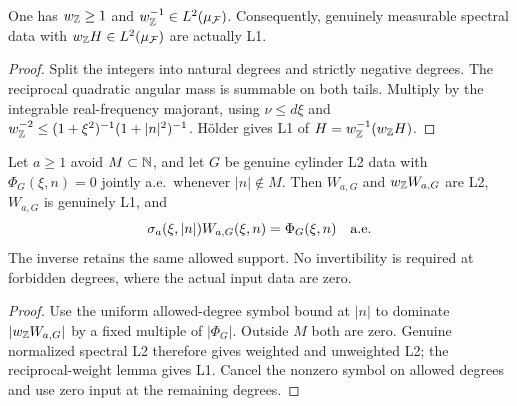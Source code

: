 \begin{lemma}
\label{lem:cylinder-signed-mass}
\leanok
One has $w_{\mathbb{Z}}\ge1$ and $w_{\mathbb{Z}}^{-1}\in L^2(\mu_{\mathcal F})$.
Consequently, genuinely measurable spectral data with
$w_{\mathbb{Z}}H\in L^2(\mu_{\mathcal F})$ are actually L1.
\end{lemma}

\begin{proof}
\leanok
Split the integers into natural degrees and strictly negative degrees. The
reciprocal quadratic angular mass is summable on both tails. Multiply by the
integrable real-frequency majorant, using $\nu\le d\xi$ and
$w_{\mathbb{Z}}^{-2}\le(1+\xi^2)^{-1}(1+|n|^2)^{-1}$. Hölder gives L1 of
$H=w_{\mathbb{Z}}^{-1}(w_{\mathbb{Z}}H)$.
\end{proof}

\begin{lemma}
\label{lem:cylinder-signed-inverse}
\leanok
Let $a\ge1$ avoid $M\subset\mathbb{N}$, and let $G$ be genuine cylinder L2 data with
$\Phi_G(\xi,n)=0$ jointly a.e.\ whenever $|n|\notin M$.
Then $W_{a,G}$ and $w_{\mathbb{Z}}W_{a,G}$ are L2, $W_{a,G}$ is genuinely L1, and
\[
 \sigma_a(\xi,|n|)W_{a,G}(\xi,n)=\Phi_G(\xi,n)\quad\hbox{a.e.}
\]
The inverse retains the same allowed support. No invertibility is required at
forbidden degrees, where the actual input data are zero.
\end{lemma}

\begin{proof}
\leanok
Use the uniform allowed-degree symbol bound at $|n|$ to dominate
$|w_{\mathbb{Z}}W_{a,G}|$ by a fixed multiple of $|\Phi_G|$. Outside $M$ both are zero.
Genuine normalized spectral L2 therefore gives weighted and unweighted L2;
the reciprocal-weight lemma gives L1. Cancel the nonzero symbol on allowed
degrees and use zero input at the remaining degrees.
\end{proof}

